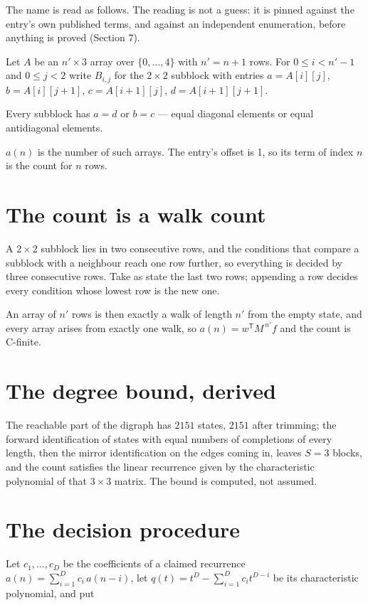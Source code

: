 \documentclass[11pt]{article}
\theoremstyle{definition}
\begin{document}
The name is read as follows. The reading is not a guess: it is pinned against the entry's own published terms, and against an independent enumeration, before anything is proved (Section 7).

Let $A$ be an $n' \times 3$ array over $\{0,\dots,4\}$ with $n' = n + 1$ rows. For $0 \le i < n'-1$ and $0 \le j < 2$ write $B_{i,j}$ for the $2\times2$ subblock with entries $a = A[i][j]$, $b = A[i][j{+}1]$, $c = A[i{+}1][j]$, $d = A[i{+}1][j{+}1]$.

Every subblock has $a = d$ or $b = c$ --- equal diagonal elements or equal antidiagonal elements.

$a(n)$ is the number of such arrays. The entry's offset is 1, so its term of index $n$ is the count for $n$ rows.

\section{The count is a walk count}

A $2\times2$ subblock lies in two consecutive rows, and the conditions that compare a subblock with a neighbour reach one row further, so everything is decided by three consecutive rows. Take as state the last two rows; appending a row decides every condition whose lowest row is the new one.

An array of $n'$ rows is then exactly a walk of length $n'$ from the empty state, and every array arises from exactly one walk, so $a(n) = w^{\mathsf T}M^{\,n'}f$ and the count is C-finite.

\section{The degree bound, derived}

The reachable part of the digraph has $2151$ states, $2151$ after trimming; the forward identification of states with equal numbers of completions of every length, then the mirror identification on the edges coming in, leaves $S = 3$ blocks, and the count satisfies the linear recurrence given by the characteristic polynomial of that $3\times3$ matrix. The bound is computed, not assumed.

\section{The decision procedure}

Let $c_1,\dots,c_D$ be the coefficients of a claimed recurrence $a(n) = \sum_{i=1}^{D} c_i\,a(n-i)$, let $q(t) = t^{D} - \sum_{i=1}^{D} c_i t^{D-i}$ be its characteristic polynomial, and put
\end{document}
